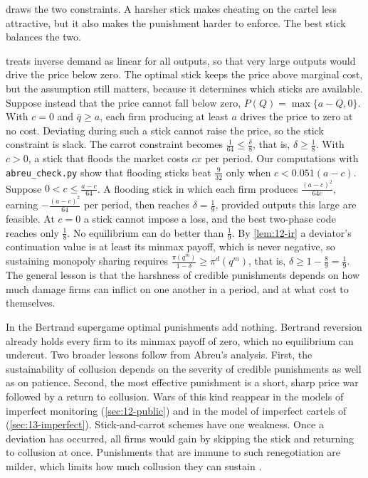  draws the two constraints. A harsher stick makes cheating on the cartel less attractive, but it
also makes the punishment harder to enforce. The best stick balances the two.

\begin{remark}\label{rem:12-abreu-floor}
 treats inverse demand as linear for all outputs, so that very large outputs would drive the
price below zero. The optimal stick keeps the price above marginal cost, but the assumption still matters, because it
determines which sticks are available. Suppose instead that the price cannot fall below zero,
$P(Q) = \max\{a - Q, 0\}$. With $c = 0$ and $\bar q \ge a$, each firm producing at least $a$ drives the price to zero
at no cost.
Deviating during such a stick cannot raise the price, so the stick constraint is slack. The carrot constraint
becomes $\frac{1}{64} \le \frac{\delta}{8}$, that is, $\delta \ge \frac{1}{8}$. With $c > 0$, a stick that floods the
market costs $cx$ per period. Our computations with \texttt{abreu\_check.py} show that flooding sticks beat
$\frac{9}{32}$ only when $c < 0.051(a - c)$. Suppose $0 < c \le \frac{a - c}{64}$. A flooding stick in which each
firm produces $\frac{(a - c)^2}{64c}$, earning $-\frac{(a - c)^2}{64}$ per period, then reaches $\delta = \frac{1}{9}$,
provided outputs this large are feasible. At $c = 0$ a stick cannot impose a loss, and the best two-phase code
reaches only $\frac{1}{8}$. No equilibrium can do better than $\frac{1}{9}$. By \cref{lem:12-ir} a deviator's continuation value is at least
its minmax payoff, which is never negative, so sustaining monopoly sharing requires $\frac{\pi(q^m)}{1 - \delta} \ge \pi^d(q^m)$, that is,
$\delta \ge 1 - \frac{8}{9} = \frac{1}{9}$. The general lesson is that the harshness of credible punishments depends on
how much damage firms can inflict on one another in a period, and at what cost to themselves.
\end{remark}

In the Bertrand supergame optimal punishments add nothing. Bertrand reversion already holds every firm to its minmax
payoff of zero, which no equilibrium can undercut. Two broader lessons follow from Abreu's analysis. First, the
sustainability of collusion depends on the severity of credible punishments as well as on patience. Second, the most
effective punishment is a short, sharp price war followed by a return to collusion. Wars of this kind reappear in the
models of imperfect monitoring (\cref{sec:12-public}) and in the model of imperfect cartels of \citet{BernheimMadsen2017}
(\cref{sec:13-imperfect}). Stick-and-carrot schemes have one weakness. Once a deviation has occurred, all firms would
gain by skipping the stick and returning to collusion at once. Punishments that are immune to such renegotiation are
milder, which limits how much collusion they can sustain \citep{FarrellMaskin1989}.

